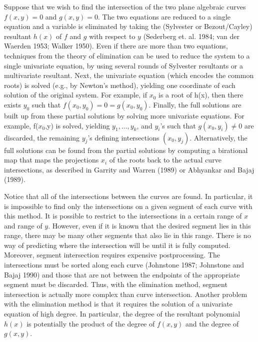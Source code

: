 \begin{example}
Suppose that we wish to find the intersection of the two plane algebraic curves 
$f(x,y)=0$ and $g(x,y)=0$.
The two equations are reduced to a single equation and a variable is eliminated
by taking the (Sylvester or Bezout/Cayley) resultant $h(x)$ of $f$ and $g$ 
with respect to $y$ (Sederberg et. al. 1984; van der Waerden 1953; Walker 1950).
Even if there are more than two equations, techniques from the theory of elimination
can be used to reduce the system to a single univariate equation, by using several
rounds of Sylvester resultants or a multivariate resultant.
Next, the univariate equation (which encodes the common roots) is solved
(e.g., by Newton's method), yielding one coordinate of each solution of the original 
system.
For example, if $x_{0}$ is a root of h(x),
then there exists $y_{0}$ such that $f(x_{0},y_{0})=0=g(x_{0},y_{0})$.
Finally, the full solutions are built up from these partial solutions
by solving more univariate equations.
For example, f($x_{0}$,y) is solved, yielding $y_{1},\ldots,y_{k}$,
and $y_{i}$'s such that $g(x_{0},y_{i}) \neq 0$ are discarded,
the remaining $y_{j}$'s defining intersections $(x_{0},y_{j})$.
Alternatively, the full solutions can be found from the partial solutions by
computing a birational map that maps the projections $x_{i}$ of the
roots back to the actual curve intersections, as described in Garrity and Warren (1989)
or Abhyankar and Bajaj (1989).
\end{example}

Notice that all of the intersections between the curves are found.
In particular, it is impossible to find only the intersections on a given segment of each curve 
with this method.
It is possible to restrict to the intersections in a certain range of $x$ and
range of $y$.
However, even if it is known that the desired segment lies in this range, there may be
many other segments that also lie in this range.
There is no way of predicting where the intersection will be until it is fully computed.
Moreover, segment intersection requires expensive postprocessing. 
The intersections must be sorted along each curve (Johnstone 1987; Johnstone and Bajaj 1990)
and those that are not between the endpoints
of the appropriate segment must be discarded.
Thus, with the elimination method, segment intersection is actually more complex than curve
intersection.
Another problem with the elimination method is that it requires the solution of a 
univariate equation of high degree.
In particular, the degree of the resultant polynomial $h(x)$ is potentially
the product of the degree of $f(x,y)$ and the degree of $g(x,y)$.

